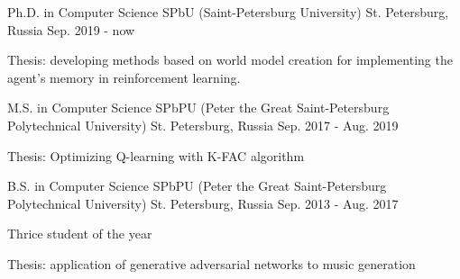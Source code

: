 

\begin{cventries}

  \cventry
	{Ph.D. in Computer Science} %
	{SPbU (Saint-Petersburg University)} %
	{St. Petersburg, Russia} %
	{Sep. 2019 - now} %
	{
	  	\begin{cvitems} %
	  		\item {Thesis: developing methods based on world model creation for implementing the agent's memory in reinforcement learning.}
	  	\end{cvitems}
	}
  
  \cventry
	{M.S. in Computer Science} %
	{SPbPU (Peter the Great Saint-Petersburg Polytechnical University)} %
	{St. Petersburg, Russia} %
	{Sep. 2017 - Aug. 2019} %
	{
	 	\begin{cvitems} %
	 		\item {Thesis: Optimizing Q-learning with K-FAC algorithm}
	 	\end{cvitems}
	}
    

  \cventry
	{B.S. in Computer Science} %
	{SPbPU (Peter the Great Saint-Petersburg Polytechnical University)} %
	{St. Petersburg, Russia} %
	{Sep. 2013 - Aug. 2017} %
	{
		\begin{cvitems} %
			\item {Thrice student of the year}
			\item {Thesis: application of generative adversarial networks to music generation}
		\end{cvitems}
	}

\end{cventries}
